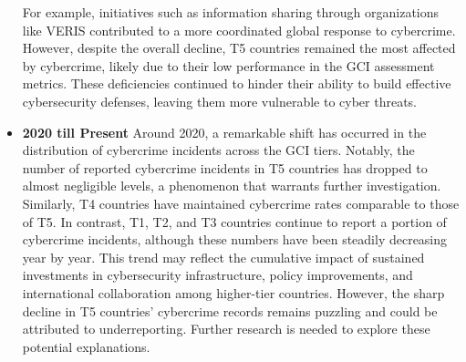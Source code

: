 \begin{itemize}
			For example, initiatives such as information sharing through organizations like VERIS
			contributed to a more coordinated global response to cybercrime.
			However, despite the overall decline, T5 countries remained the most affected by cybercrime,
			likely due to their low performance in the GCI assessment metrics.
			These deficiencies continued to hinder their ability to build effective cybersecurity defenses,
			leaving them more vulnerable to cyber threats.
		\item \textbf{2020 till Present} Around 2020, a remarkable shift has occurred in the distribution of cybercrime incidents across the GCI tiers.
			Notably, the number of reported cybercrime incidents in T5 countries has dropped to almost negligible levels,
			a phenomenon that warrants further investigation.
			Similarly, T4 countries have maintained cybercrime rates comparable to those of T5.
			In contrast, T1, T2, and T3 countries continue to report a portion of cybercrime incidents,
			although these numbers have been steadily decreasing year by year.
			This trend may reflect the cumulative impact of sustained investments in cybersecurity infrastructure, policy improvements, and international collaboration among higher-tier countries.
			However, the sharp decline in T5 countries' cybercrime records remains puzzling and could be attributed to underreporting.
			Further research is needed to explore these potential explanations.
	\end{itemize}
